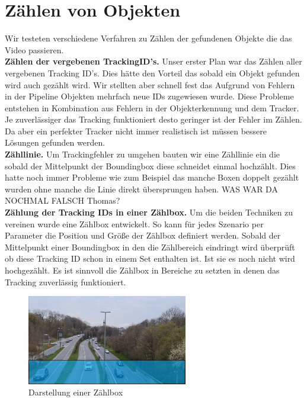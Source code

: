 \documentclass[conference]{IEEEtran}
\begin{document}
	\section{Zählen von Objekten}
	Wir testeten verschiedene Verfahren zu Zählen der gefundenen Objekte die das Video passieren.\\
	\textbf{Zählen der vergebenen TrackingID's.} Unser erster Plan war das Zählen aller vergebenen Tracking ID's. Dies hätte den Vorteil das sobald ein Objekt gefunden wird auch gezählt wird. Wir stellten aber schnell fest das Aufgrund von Fehlern in der Pipeline Objekten mehrfach neue IDs zugewiesen wurde. Diese Probleme entstehen in Kombination aus Fehlern in der Objekterkennung und dem Tracker. Je zuverlässiger das Tracking funktioniert desto geringer ist der Fehler im Zählen. Da aber ein perfekter Tracker nicht immer realistisch ist müssen bessere Lösungen gefunden werden.\\
	\textbf{Zähllinie.} Um Trackingfehler zu umgehen bauten wir eine Zähllinie ein die sobald der Mittelpunkt der Boundingbox diese schneidet einmal hochzählt. Dies hatte noch immer Probleme wie zum Beispiel das manche Boxen doppelt gezählt wurden ohne manche die Linie direkt übersprungen haben. WAS WAR DA NOCHMAL FALSCH Thomas?\\
	\textbf{Zählung der Tracking IDs in einer Zählbox.} Um die beiden Techniken zu vereinen wurde eine Zählbox entwickelt. So kann für jedes Szenario per Parameter die Position und Größe der Zählbox definiert werden. Sobald der Mittelpunkt einer Boundingbox in den die Zählbereich eindringt wird überprüft ob diese Tracking ID schon in einem Set enthalten ist. Ist sie es noch nicht wird hochgezählt. Es ist sinnvoll die Zählbox in Bereiche zu setzten in denen das Tracking zuverlässig funktioniert. 
	\begin{figure}[!h]
		\begin{center}
			\includegraphics[width=7cm]{Media/BrudermuhlCounter.png}
			\caption{Darstellung einer Zählbox}
			\label{Counter}
		\end{center}
	\end{figure}
	
\end{document}
